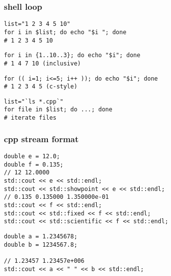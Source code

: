 \documentclass[10pt]{article}
\begin{document}
\begin{multicols*}{2}
    \subsubsection*{shell loop}
    \begin{tcolorbox}[halign=left]
        \begin{verbatim}
list="1 2 3 4 5 10" 
for i in $list; do echo "$i "; done
# 1 2 3 4 5 10
        \end{verbatim}
    \end{tcolorbox}
    \begin{tcolorbox}[halign=left]
        \begin{verbatim}
for i in {1..10..3}; do echo "$i"; done
# 1 4 7 10 (inclusive)
        \end{verbatim}
    \end{tcolorbox}
    \begin{tcolorbox}[halign=left]
        \begin{verbatim}
for (( i=1; i<=5; i++ )); do echo "$i"; done
# 1 2 3 4 5 (c-style)
        \end{verbatim}
    \end{tcolorbox}
    \begin{tcolorbox}[halign=left]
        \begin{verbatim}
list="`ls *.cpp`" 
for file in $list; do ...; done
# iterate files
        \end{verbatim}
    \end{tcolorbox}

    \newpage
    \subsubsection*{cpp stream format}
    \begin{tcolorbox}[halign=left]
        \begin{verbatim}
double e = 12.0;
double f = 0.135;
// 12 12.0000
std::cout << e << std::endl;
std::cout << std::showpoint << e << std::endl;
// 0.135 0.135000 1.350000e-01
std::cout << f << std::endl;
std::cout << std::fixed << f << std::endl;
std::cout << std::scientific << f << std::endl;
        \end{verbatim}
    \end{tcolorbox}

    \begin{tcolorbox}[halign=left]
        \begin{verbatim}
double a = 1.2345678;
double b = 1234567.8;

// 1.23457 1.23457e+006
std::cout << a << " " << b << std::endl; 


\end{verbatim}
\end{tcolorbox}
\end{multicols*}
\end{document}
